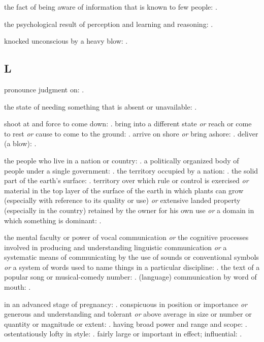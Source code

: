   the fact of being aware of information that is known to few people: .

  the psychological result of perception and learning and reasoning: .

  knocked unconscious by a heavy blow: .

\subsection*{L}

  pronounce judgment on: .

  the state of needing something that is absent or unavailable: .

  shoot at and force to come down: . bring into a different state \textit{or} reach or come to rest \textit{or} cause to come to the ground: . arrive on shore \textit{or} bring ashore: . deliver (a blow): .

  the people who live in a nation or country: . a politically organized body of people under a single government: . the territory occupied by a nation: . the solid part of the earth's surface: . territory over which rule or control is exercised \textit{or} material in the top layer of the surface of the earth in which plants can grow (especially with reference to its quality or use) \textit{or} extensive landed property (especially in the country) retained by the owner for his own use \textit{or} a domain in which something is dominant: .

  the mental faculty or power of vocal communication \textit{or} the cognitive processes involved in producing and understanding linguistic communication \textit{or} a systematic means of communicating by the use of sounds or conventional symbols \textit{or} a system of words used to name things in a particular discipline: . the text of a popular song or musical-comedy number: . (language) communication by word of mouth: .

  in an advanced stage of pregnancy: . conspicuous in position or importance \textit{or} generous and understanding and tolerant \textit{or} above average in size or number or quantity or magnitude or extent: . having broad power and range and scope: . ostentatiously lofty in style: . fairly large or important in effect; influential: .

